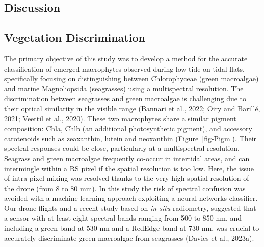 \documentclass[
  letterpaper,
  11pt,
  english,
  singlespacing,
  headsepline]{MastersDoctoralThesis}
\begin{document}
\begin{spacing}{1.5}
\section{Discussion}\label{discussion-1}

\subsection{Vegetation Discrimination}\label{vegetation-discrimination}

The primary objective of this study was to develop a method for the
accurate classification of emerged macrophytes observed during low tide
on tidal flats, specifically focusing on distinguishing between
Chlorophyceae (green macroalgae) and marine Magnoliopsida (seagrasses)
using a multispectral resolution. The discrimination between seagrasses
and green macroalgae is challenging due to their optical similarity in
the visible range (Bannari et al., 2022; Oiry and Barillé, 2021; Veettil
et al., 2020). These two macrophytes share a similar pigment
composition: Chla, Chlb (an additional photosynthetic pigment), and
accessory carotenoids such as zeaxanthin, lutein and neoxanthin
(Figure~\ref{fig-Pigm}). Their spectral responses could be close,
particularly at a multispectral resolution. Seagrass and green
macroalgae frequently co-occur in intertidal areas, and can intermingle
within a RS pixel if the spatial resolution is too low. Here, the issue
of intra-pixel mixing was resolved thanks to the very high spatial
resolution of the drone (from 8 to 80 mm). In this study the risk of
spectral confusion was avoided with a machine-learning approach
exploiting a neural networks classifier. Our drone flights and a recent
study based on \emph{in situ} radiometry, suggested that a sensor with
at least eight spectral bands ranging from 500 to 850 nm, and including
a green band at 530 nm and a RedEdge band at 730 nm, was crucial to
accurately discriminate green macroalgae from seagrasses (Davies et al.,
2023a).

\begin{figure}

\end{figure}
\end{spacing}
\end{document}
